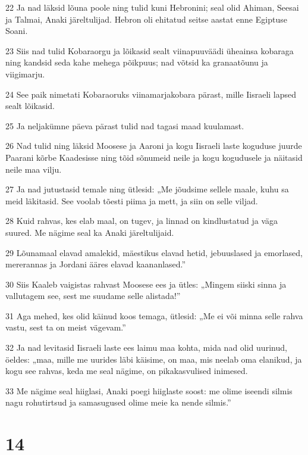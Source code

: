\par 22 Ja nad läksid lõuna poole ning tulid kuni Hebronini; seal olid Ahiman, Seesai ja Talmai, Anaki järeltulijad. Hebron oli ehitatud seitse aastat enne Egiptuse Soani.
\par 23 Siis nad tulid Kobaraorgu ja lõikasid sealt viinapuuväädi üheainsa kobaraga ning kandsid seda kahe mehega põikpuus; nad võtsid ka granaatõunu ja viigimarju.
\par 24 See paik nimetati Kobaraoruks viinamarjakobara pärast, mille Iisraeli lapsed sealt lõikasid.
\par 25 Ja neljakümne päeva pärast tulid nad tagasi maad kuulamast.
\par 26 Nad tulid ning läksid Moosese ja Aaroni ja kogu Iisraeli laste koguduse juurde Paarani kõrbe Kaadesisse ning tõid sõnumeid neile ja kogu kogudusele ja näitasid neile maa vilju.
\par 27 Ja nad jutustasid temale ning ütlesid: „Me jõudsime sellele maale, kuhu sa meid läkitasid. See voolab tõesti piima ja mett, ja siin on selle viljad.
\par 28 Kuid rahvas, kes elab maal, on tugev, ja linnad on kindlustatud ja väga suured. Me nägime seal ka Anaki järeltulijaid.
\par 29 Lõunamaal elavad amalekid, mäestikus elavad hetid, jebuuslased ja emorlased, mererannas ja Jordani ääres elavad kaananlased.”
\par 30 Siis Kaaleb vaigistas rahvast Moosese ees ja ütles: „Mingem siiski sinna ja vallutagem see, sest me suudame selle alistada!”
\par 31 Aga mehed, kes olid käinud koos temaga, ütlesid: „Me ei või minna selle rahva vastu, sest ta on meist vägevam.”
\par 32 Ja nad levitasid Iisraeli laste ees laimu maa kohta, mida nad olid uurinud, öeldes: „maa, mille me uurides läbi käisime, on maa, mis neelab oma elanikud, ja kogu see rahvas, keda me seal nägime, on pikakasvulised inimesed.
\par 33 Me nägime seal hiiglasi, Anaki poegi hiiglaste soost: me olime iseendi silmis nagu rohutirtsud ja samasugused olime meie ka nende silmis.”

\chapter{14}

